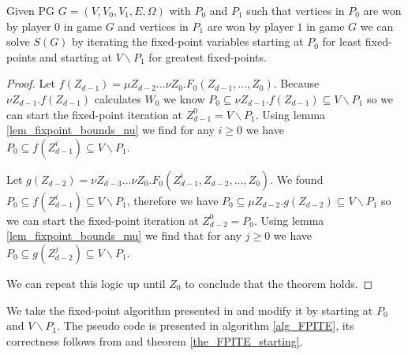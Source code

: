 \begin{theorem}
	\label{the_FPITE_starting}
	Given PG $G = (V,V_0,V_1,E,\Omega)$ with $P_0$ and $P_1$ such that vertices  in $P_0$ are won by player $0$ in game $G$ and vertices in $P_1$ are won by player $1$ in game $G$ we can solve $S(G)$ by iterating the fixed-point variables starting at $P_0$ for least fixed-points and starting at $V \backslash P_1$ for greatest fixed-points.
	\begin{proof}
		Let $f(Z_{d-1}) = \mu Z_{d-2}\dots\nu Z_0.F_0(Z_{d-1},\dots,Z_0)$. Because $\nu Z_{d-1}.f(Z_{d-1})$ calculates $W_0$ we know $P_0 \subseteq \nu Z_{d-1}.f(Z_{d-1}) \subseteq V \backslash P_1$ so we can start the fixed-point iteration at $Z_{d-1}^0 = V\backslash P_1$. Using lemma \ref{lem_fixpoint_bounds_nu} we find for any $i \geq 0$ we have $P_0 \subseteq f(Z_{d-1}^i) \subseteq V \backslash P_1$.
		
		Let $g(Z_{d-2}) = \nu Z_{d-3} \dots \nu Z_0. F_0(Z_{d-1}^i,Z_{d-2},\dots,Z_0)$. We found $P_0 \subseteq f(Z_{d-1}^i) \subseteq V \backslash P_1$, therefore we have $P_0 \subseteq \mu Z_{d-2}.g(Z_{d-2})\subseteq V \backslash P_1$ so we can start the fixed-point iteration at $Z_{d-2}^0 = P_0$. Using lemma \ref{lem_fixpoint_bounds_mu} we find that for any $j \geq 0$ we have $P_0 \subseteq g(Z_{d-2}^j) \subseteq V\backslash P_1$.
		
		We can repeat this logic up until $Z_0$ to conclude that the theorem holds.
	\end{proof}
\end{theorem}
We take the fixed-point algorithm presented in \cite{FPITE} and modify it by starting at $P_0$ and $V \backslash P_1$. The pseudo code is presented in algorithm \ref{alg_FPITE}, its correctness follows from \cite{FPITE} and theorem \ref{the_FPITE_starting}.
